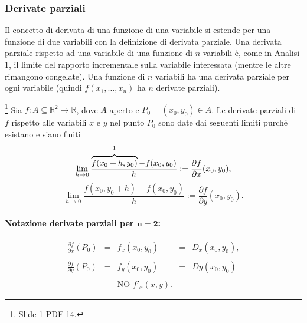 \subsubsection{Derivate parziali}
Il concetto di derivata di una funzione di una variabile si estende per una funzione di due variabili con la definizione di derivata parziale. Una derivata parziale rispetto ad una variabile di una funzione di $n$ variabili è, come in Analisi 1, il limite del rapporto incrementale sulla variabile interessata (mentre le altre rimangono congelate). Una funzione di $n$ variabili ha una derivata parziale per ogni variabile (quindi $f(x_1,\hdots,x_n)$ ha $n$ derivate parziali).

\begin{definition}[Derivate parziali (caso $n=2$)]\footnote{Slide 1 PDF 14.}
    Sia $f:A\subseteq\mathbb R^2\rightarrow\mathbb R$, dove $A$ aperto e $P_0=(x_0,y_0)\in A$. Le derivate parziali di $f$ rispetto alle variabili $x$ e $y$ nel punto $P_0$ sono date dai seguenti limiti purché esistano e siano finiti
    \begin{equation}\label{eq:derivata_parziale_x}
        \lim_{h\rightarrow 0}\frac{\overbrace{f(x_0+h, y_0)}^{\footnotemark}-f(x_0, y_0)}{h}:=\frac{\partial f}{\partial x}(x_0,y_0),
    \end{equation}
    \begin{equation}\label{eq:derivata_parziale_y}
        \lim_{h\rightarrow 0}\frac{f(x_0, y_0+h)-f(x_0, y_0)}{h}:=\frac{\partial f}{\partial y}(x_0,y_0).
    \end{equation}
\end{definition}

\paragraph{Notazione derivate parziali per $\boldsymbol{n=2}$:}
\begin{equation*}
    \begin{matrix}
        \frac{\partial f}{\partial x}(P_0)&=&f_x(x_0,y_0)&=& D_x(x_0,y_0),\\\\
        \frac{\partial f}{\partial y}(P_0) &=& f_y(x_0,y_0) &=& Dy(x_0,y_0)\\\\
        &&\text{NO } f'_x(x,y).&&
    \end{matrix}
\end{equation*}

